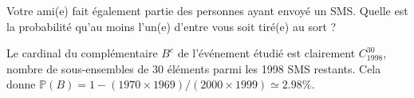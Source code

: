 {\begin{question}
\qkeeporder
Votre ami(e) fait également partie des personnes ayant envoyé un SMS. Quelle est la probabilité qu'au moins l'un(e) d'entre vous soit tiré(e) au sort ?
\begin{answers}
\end{answers}
\begin{explanations}
Le cardinal du complémentaire $B^c$ de l'événement étudié est clairement $C_{1998}^{30}$,  nombre de sous-ensembles de 30 éléments parmi les 1998 SMS restants. Cela donne $\mathbb{P}(B)=1- (1970\times 1969)/(2000\times 1999) \simeq  2.98\%$.
\end{explanations}
\end{question}
}
